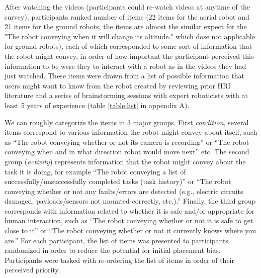 \documentclass[letterpaper, 10 pt, conference]{ieeeconf}  %
\begin{document}
    After watching the videos (participants could re-watch videos at anytime of the survey), participants ranked number of items (22 items for the aerial robot and 21 items for the ground robots, the items are almost the similar expect for the "The robot conveying when it will change its altitude." which dose not applicable for ground robots), each of which corresponded to some sort of information that the robot might convey, in order of how important the participant perceived this information to be were they to interact with a robot as in the videos they had just watched. These items were drawn from a list of possible information that users might want to know from the robot created by reviewing prior HRI literature and a series of brainstorming sessions with expert roboticists with at least 5 years of experience (table \ref{table:list} in appendix A). 
    
    We can roughly categorize the items in 3 major groups. First \textit{condition}\cite{cha2018survey}, several items correspond to various information the robot might convey about itself, such as ``The robot conveying whether or not its camera is recording'' or ``The robot conveying when and in what direction robot would move next'' etc. The second group (\textit{activity}\cite{cha2018survey}) represents information that the robot might convey about the task it is doing, for example ``The robot conveying a list of successfully/unsuccessfully completed tasks (task history)'' or ``The robot conveying whether or not any faults/errors are detected (e.g., electric circuits damaged, payloads/sensors not mounted correctly, etc.).'' Finally, the third group corresponds with information related to whether it is safe and/or appropriate for human interaction, such as ``The robot conveying whether or not it is safe to get close to it'' or ``The robot conveying whether or not it currently knows where you are.'' For each participant, the list of items was presented to participants randomized in order to reduce the potential for initial placement bias. Participants were tasked with re-ordering the list of items in order of their perceived priority. 
    
\end{document}
